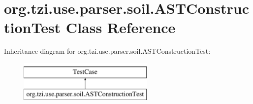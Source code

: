 \hypertarget{classorg_1_1tzi_1_1use_1_1parser_1_1soil_1_1_a_s_t_construction_test}{\section{org.\-tzi.\-use.\-parser.\-soil.\-A\-S\-T\-Construction\-Test Class Reference}
\label{classorg_1_1tzi_1_1use_1_1parser_1_1soil_1_1_a_s_t_construction_test}
}
Inheritance diagram for org.\-tzi.\-use.\-parser.\-soil.\-A\-S\-T\-Construction\-Test\-:\begin{figure}[H]
\begin{center}
\leavevmode
\includegraphics[height=2.000000cm]{classorg_1_1tzi_1_1use_1_1parser_1_1soil_1_1_a_s_t_construction_test}
\end{center}
\end{figure}
